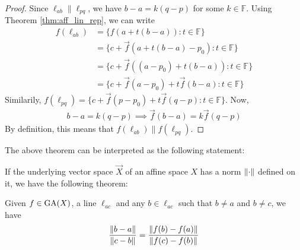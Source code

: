 \begin{proof}
    Since $\ell_{ab}\parallel\ell_{pq}$, we have $b-a=k(q-p)$ for some
    $k\in\mathbb{F}$. Using Theorem \ref{thm:aff_lin_rep}, we can write
    \begin{align*}
        f(\ell_{ab}) &= \{f(a + t(b-a))\colon t\in\mathbb{F}\} \\
                     &= \{c + \vec{f}(a + t(b-a) - p_0)\colon t\in\mathbb{F}\} \\
                     &= \{c + \vec{f}((a-p_0)+t(b-a))\colon t\in\mathbb{F}\} \\
                     &= \{c + \vec{f}(a-p_0) + t\vec{f}(b-a)\colon t\in\mathbb{F}\}
    \end{align*}
    Similarily,
    $f(\ell_{pq}) = \{c + \vec{f}(p - p_0) +t\vec{f}(q-p)\colon t\in\mathbb{F}\}$.
    Now,
    \begin{align*}
        b - a = k(q - p) \implies \vec{f}(b-a) = k\vec{f}(q - p)
    \end{align*}
    By definition, this means that $f(\ell_{ab}) \parallel f(\ell_{pq})$.

\end{proof}

The above theorem can be interpreted as the following statement:
\vspace{1ex}

\begin{center}
\end{center}
\vspace{1ex}

\noindent
If the underlying vector space $\vec{X}$ of an affine space $X$ has a norm 
$\left\lVert{\cdot}\right\rVert$ defined on it, we have the following theorem:

\begin{theorem}
    Given $f\in\operatorname{GA}(X)$, a line $\ell_{ac}$ and any $b\in\ell_{ac}$ such that
    $b \neq a$ and $b \neq c$, we have
    \[ \frac{\left\lVert{b-a}\right\rVert}{\left\lVert{c-b}\right\rVert}=\frac{\left\lVert{f(b)-f(a)}\right\rVert}{\left\lVert{f(c)-f(b)}\right\rVert} \]
\end{theorem}

